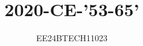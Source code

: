 \documentclass[journal,12pt,onecolumn]{IEEEtran}
\theoremstyle{remark}
\begin{document}

\vspace{3cm}


\title{2020-CE-'53-65'}
\author{EE24BTECH11023}
\maketitle




{\let\newpage\relax\maketitle}

\renewcommand{\thefigure}{\theenumi}
\renewcommand{\thetable}{\theenumi}
\setlength{\intextsep}{10pt} %


\renewcommand{\thetable}{\theenumi}
\end{document}
